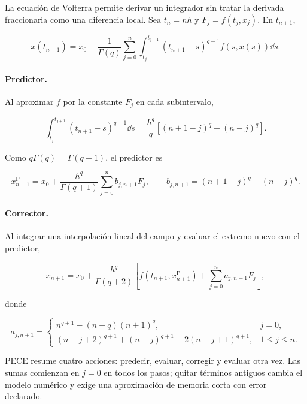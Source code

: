La ecuación de Volterra permite derivar un integrador sin tratar la derivada
fraccionaria como una diferencia local. Sea $t_n=nh$ y
$F_j=f(t_j,x_j)$. En $t_{n+1}$,

\begin{equation}
 x(t_{n+1})=x_0+
 \frac{1}{\Gamma(q)}\sum_{j=0}^{n}
 \int_{t_j}^{t_{j+1}}
 (t_{n+1}-s)^{q-1}f(s,x(s))\dd s.
 \label{eq:gt-volterra-intervalos}
\end{equation}

\paragraph{Predictor.}
Al aproximar $f$ por la constante $F_j$ en cada subintervalo,

\begin{equation}
 \int_{t_j}^{t_{j+1}}(t_{n+1}-s)^{q-1}\dd s
 =\frac{h^q}{q}\left[(n+1-j)^q-(n-j)^q\right].
 \label{eq:gt-integral-peso-predictor}
\end{equation}

Como $q\Gamma(q)=\Gamma(q+1)$, el predictor es

\begin{equation}
 x_{n+1}^{\mathrm P}=x_0+
 \frac{h^q}{\Gamma(q+1)}
 \sum_{j=0}^{n}b_{j,n+1}F_j,\qquad
 b_{j,n+1}=(n+1-j)^q-(n-j)^q.
 \label{eq:gt-abm-predictor}
\end{equation}

\paragraph{Corrector.}
Al integrar una interpolación lineal del campo y evaluar el extremo nuevo con el
predictor,

\begin{equation}
 x_{n+1}=x_0+
 \frac{h^q}{\Gamma(q+2)}
 \left[f(t_{n+1},x_{n+1}^{\mathrm P})+
 \sum_{j=0}^{n}a_{j,n+1}F_j\right],
 \label{eq:gt-abm-corrector}
\end{equation}

donde

\begin{equation}
 a_{j,n+1}=
 \begin{cases}
 n^{q+1}-(n-q)(n+1)^q, & j=0,\\
 (n-j+2)^{q+1}+(n-j)^{q+1}-2(n-j+1)^{q+1},
 &1\leq j\leq n.
 \end{cases}
 \label{eq:gt-abm-pesos}
\end{equation}

PECE resume cuatro acciones: predecir, evaluar, corregir y evaluar otra vez. Las sumas
comienzan en $j=0$ en todos los pasos; quitar términos antiguos cambia el modelo
numérico y exige una aproximación de memoria corta con error declarado.

